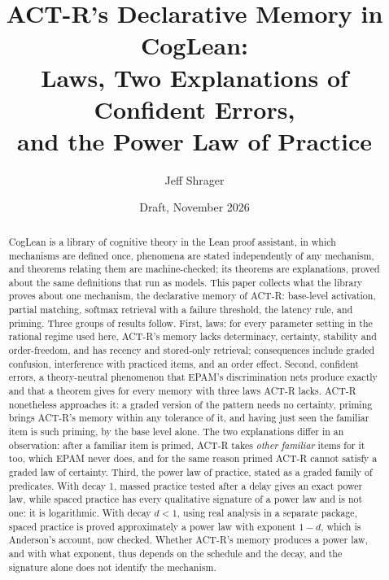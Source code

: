 \documentclass[11pt]{article}
\title{ACT-R's Declarative Memory in CogLean:\\Laws, Two Explanations of Confident Errors,\\and the Power Law of Practice}
\author{Jeff Shrager}
\date{Draft, November 2026}
\begin{document}
\sloppy
\maketitle

\begin{center}
\end{center}
\medskip

\begin{abstract}
CogLean is a library of cognitive theory in the Lean proof assistant, in which mechanisms are defined once, phenomena are stated independently of any mechanism, and theorems relating them are machine-checked; its theorems are explanations, proved about the same definitions that run as models. This paper collects what the library proves about one mechanism, the declarative memory of ACT-R: base-level activation, partial matching, softmax retrieval with a failure threshold, the latency rule, and priming. Three groups of results follow. First, laws: for every parameter setting in the rational regime used here, ACT-R's memory lacks determinacy, certainty, stability and order-freedom, and has recency and stored-only retrieval; consequences include graded confusion, interference with practiced items, and an order effect. Second, confident errors, a theory-neutral phenomenon that EPAM's discrimination nets produce exactly and that a theorem gives for every memory with three laws ACT-R lacks. ACT-R nonetheless approaches it: a graded version of the pattern needs no certainty, priming brings ACT-R's memory within any tolerance of it, and having just seen the familiar item is such priming, by the base level alone. The two explanations differ in an observation: after a familiar item is primed, ACT-R takes \emph{other familiar} items for it too, which EPAM never does, and for the same reason primed ACT-R cannot satisfy a graded law of certainty. Third, the power law of practice, stated as a graded family of predicates. With decay 1, massed practice tested after a delay gives an exact power law, while spaced practice has every qualitative signature of a power law and is not one: it is logarithmic. With decay $d<1$, using real analysis in a separate package, spaced practice is proved approximately a power law with exponent $1-d$, which is Anderson's account, now checked. Whether ACT-R's memory produces a power law, and with what exponent, thus depends on the schedule and the decay, and the signature alone does not identify the mechanism.
\end{abstract}
\end{document}
